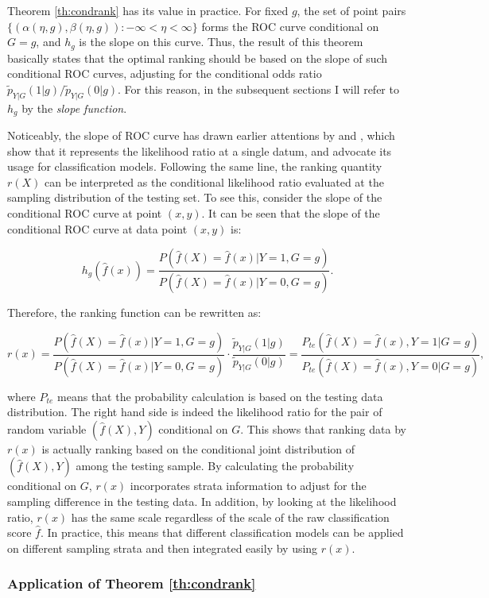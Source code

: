 \documentclass{article} %
\begin{document}
Theorem \ref{th:condrank} has its value in practice. For fixed $g$, the set of point pairs $\{(\alpha(\eta,g),\beta(\eta,g)):-\infty<\eta<\infty\}$ forms the ROC curve conditional on $G=g$, and $h_g$ is the slope on this curve. Thus, the result of this theorem basically states that the optimal ranking should be based on the slope of such conditional ROC curves, adjusting for the conditional odds ratio $\tilde p_{Y|G}(1|g)/\tilde p_{Y|G}(0|g)$. For this reason, in the subsequent sections I will refer to $h_g$ by the \textit{slope function}.

Noticeably, the slope of ROC curve has drawn earlier attentions by \cite{choi1998slopes} and \cite{johnson2004advantages}, which show that it represents the likelihood ratio at a single datum, and advocate its usage for classification models. Following the same line, the ranking quantity $r(X)$ can be interpreted as the conditional likelihood ratio evaluated at the sampling distribution of the testing set. To see this, consider the slope of the conditional ROC curve at point $(x,y)$. It can be seen that the slope of the conditional ROC curve at data point $(x,y)$ is:

\[
h_g(\hat f(x))=\frac{P(\hat f(X)=\hat f(x)|Y=1,G=g)}{P(\hat f(X)=\hat f(x)|Y=0,G=g)}.
\]

Therefore, the ranking function can be rewritten as:

\[
r(x)=\frac{P(\hat f(X)=\hat f(x)|Y=1,G=g)}{P(\hat f(X)=\hat f(x)|Y=0,G=g)}\cdot\frac{\tilde p_{Y|G}(1|g)}{\tilde p_{Y|G}(0|g)}=\frac{P_{te}(\hat f(X)=\hat f(x),Y=1|G=g)}{P_{te}(\hat f(X)=\hat f(x),Y=0|G=g)},
\]

where $P_{te}$ means that the probability calculation is based on the testing data distribution. The right hand side is indeed the likelihood ratio for the pair of random variable $(\hat f(X),Y)$ conditional on $G$. This shows that ranking data by $r(x)$ is actually ranking based on the conditional joint distribution of $(\hat f(X), Y)$ among the testing sample. By calculating the probability conditional on $G$, $r(x)$ incorporates strata information to adjust for the sampling difference in the testing data. In addition, by looking at the likelihood ratio, $r(x)$ has the same scale regardless of the scale of the raw classification score $\hat f$. In practice, this means that different classification models can be applied on different sampling strata and then integrated easily by using $r(x)$.

\subsubsection{Application of Theorem \ref{th:condrank}}\label{sec:application}
\end{document}
